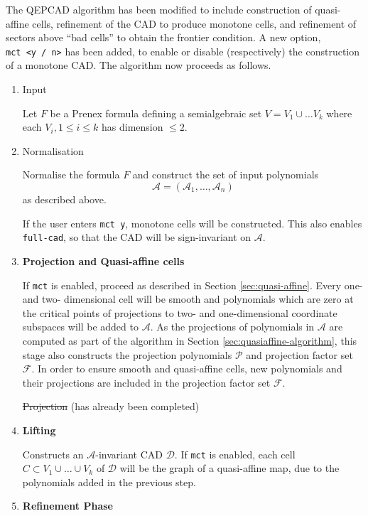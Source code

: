 \documentclass[
]{book}
\theoremstyle{definition}
\theoremstyle{definition}
\theoremstyle{definition}
\theoremstyle{definition}
\theoremstyle{remark}
\begin{document}
The QEPCAD algorithm has been modified to include construction of quasi-affine cells, refinement of the CAD to produce monotone cells, and refinement of sectors above ``bad cells'' to obtain the frontier condition. A new option, \texttt{mct\ \textless{}y\ /\ n\textgreater{}} has been added, to enable or disable (respectively) the construction of a monotone CAD. The algorithm now proceeds as follows.

\begin{enumerate}
\def\labelenumi{\arabic{enumi}.}
\item
  Input

  Let \(F\) be a Prenex formula defining a semialgebraic set \(V = V_1 \cup \ldots V_k\) where each \(V_i, 1 \le i \le k\) has dimension \(\le 2\).
\item
  Normalisation

  Normalise the formula \(F\) and construct the set of input polynomials \[
  \mathcal{A} = (\mathcal{A}_1, \ldots,\mathcal{A}_n)
   \]
  as described above.

  If the user enters \texttt{mct\ y}, monotone cells will be constructed. This also enables \texttt{full-cad}, so that the CAD will be sign-invariant on \(\mathcal{A}\).
\item
  \textbf{Projection and Quasi-affine cells}

  If \texttt{mct} is enabled, proceed as described in Section \ref{sec:quasi-affine}. Every one- and two- dimensional cell will be smooth and polynomials which are zero at the critical points of projections to two- and one-dimensional coordinate subspaces will be added to \(\mathcal{A}\). As the projections of polynomials in \(\mathcal{A}\) are computed as part of the algorithm in Section \ref{sec:quasiaffine-algorithm}, this stage also constructs the projection polynomials \(\mathcal{P}\) and projection factor set \(\mathcal{F}\). In order to ensure smooth and quasi-affine cells, new polynomials and their projections are included in the projection factor set \(\mathcal{F}\).

  \sout{Projection} (has already been completed)
\item
  \textbf{Lifting}

  Constructs an \(\mathcal{A}\)-invariant CAD \(\mathcal{D}\). If \texttt{mct} is enabled, each cell \(C \subset V_1\cup \ldots \cup V_k\) of \(\mathcal{D}\) will be the graph of a quasi-affine map, due to the polynomials added in the previous step.
\item
  \textbf{Refinement Phase}


\end{enumerate}
\end{document}
